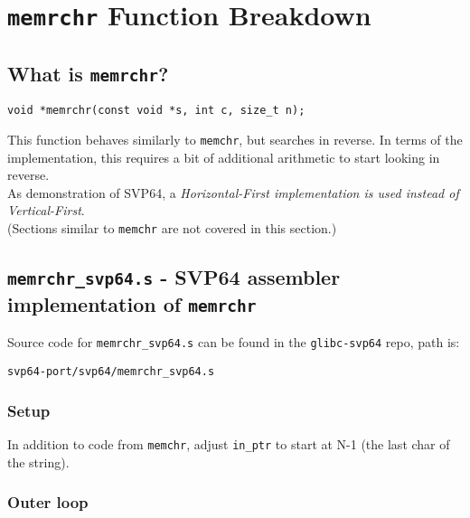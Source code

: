 %

\section{\texttt{memrchr} Function Breakdown}

\subsection{What is \texttt{memrchr}?}

\begin{verbatim}
void *memrchr(const void *s, int c, size_t n);
\end{verbatim}

This function behaves similarly to \texttt{memchr}, but searches in reverse.
In terms of the implementation, this requires a bit of additional arithmetic
to start looking in reverse.\\

As demonstration of \acrshort{SVP64}, a \textit{Horizontal-First implementation is used
instead of Vertical-First}.\\

(Sections similar to \texttt{memchr} are not covered in this section.)

\subsection{\texttt{memrchr\_svp64.s} - \acrshort{SVP64} assembler implementation of \texttt{memrchr}}

Source code for \texttt{memrchr\_svp64.s} can be found in the
\texttt{glibc-svp64} repo, path is:
\begin{verbatim}
svp64-port/svp64/memrchr_svp64.s
\end{verbatim}

\subsubsection{Setup}

In addition to code from \texttt{memchr}, adjust \texttt{in\_ptr}
to start at N-1 (the last char of the string).

\subsubsection{Outer loop}

